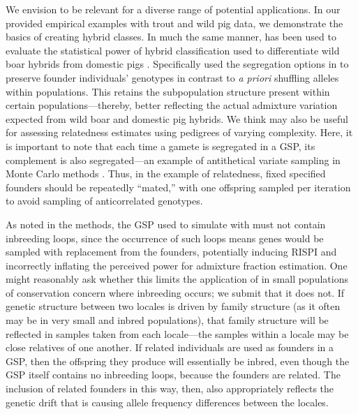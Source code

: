 {We envision \gscramble{} to be relevant for a diverse range of potential applications. In our 
provided empirical examples with trout and wild pig data, we demonstrate the basics of 
creating hybrid classes. In much the same manner, \gscramble{} has been used to evaluate the statistical power 
of hybrid classification used to differentiate wild boar hybrids from domestic pigs 
\citep{smyser2024probgen}. Specifically \citet{smyser2024probgen} used the segregation options in \gscramble{} 
 to preserve founder individuals' genotypes in contrast to \textit{a priori} shuffling alleles 
within populations. This retains the subpopulation structure present within certain populations---thereby, better reflecting the 
actual admixture variation expected from wild boar and domestic pig hybrids. We think \gscramble{} 
may also be useful for assessing relatedness estimates using pedigrees of varying complexity. Here, it 
is important to note that each time a gamete is segregated in a GSP, its complement is also 
segregated---an example of antithetical variate sampling in Monte Carlo methods \citep{hammersley}.
Thus, in the  example of relatedness, fixed specified founders should be repeatedly ``mated,'' with one offspring 
sampled per iteration to avoid sampling of anticorrelated genotypes.

As noted in the methods, the GSP used to simulate with \gscramble{} must not contain
inbreeding loops, since the occurrence of such loops means genes would be
sampled with replacement from the founders, potentially inducing RISPI and incorrectly
inflating the
perceived power for admixture fraction estimation.  One might reasonably ask whether this
limits the application of \gscramble{} in small populations of conservation concern where 
inbreeding occurs; we submit that it does not.  If genetic structure between two
locales is driven by family structure (as it often may be in very small and inbred populations), that
family structure will be reflected in samples taken from each locale---the samples within a locale 
may be close relatives of one another.  If related individuals are used as founders in a GSP, then
the offspring they produce will essentially be inbred, even though the GSP itself contains no
inbreeding loops, because the founders are related.  The inclusion of related founders in this way, then, also appropriately reflects the genetic drift that is causing allele frequency differences between the locales.   



}
